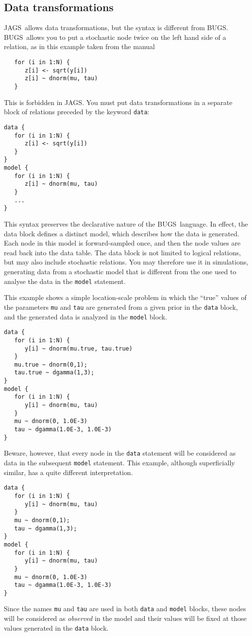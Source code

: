 \documentclass[11pt, a4paper, titlepage]{report}
\newcommand{\JAGS}{\textsf{JAGS}}
\newcommand{\BUGS}{\textsf{BUGS}}
\begin{document}



\subsection{Data transformations}
\label{section:data:tranformations}

\JAGS\ allows data transformations, but the syntax is different from
\BUGS.  \BUGS\ allows you to put a stochastic node twice on the left
hand side of a relation, as in this example taken from the manual
\begin{verbatim}
   for (i in 1:N) {
      z[i] <- sqrt(y[i])
      z[i] ~ dnorm(mu, tau)
   }
\end{verbatim}
This is forbidden in \JAGS. You must put data transformations in a 
separate block of relations preceded by the keyword \texttt{data}:
\begin{verbatim}
data {
   for (i in 1:N) {
      z[i] <- sqrt(y[i])
   }
}
model {
   for (i in 1:N) {
      z[i] ~ dnorm(mu, tau)
   }
   ...
}
\end{verbatim}
This syntax preserves the declarative nature of the \BUGS\ language.
In effect, the data block defines a distinct model, which describes
how the data is generated. Each node in this model is forward-sampled
once, and then the node values are read back into the data table. The
data block is not limited to logical relations, but may also include
stochastic relations. You may therefore use it in simulations,
generating data from a stochastic model that is different from the one
used to analyse the data in the \texttt{model} statement.

This example shows a simple location-scale problem in which the ``true''
values of the parameters \texttt{mu} and \texttt{tau} are generated
from a given prior in the \texttt{data} block, and the generated
data is analyzed in the \texttt{model} block.
\begin{verbatim}
data {
   for (i in 1:N) {
      y[i] ~ dnorm(mu.true, tau.true) 
   }
   mu.true ~ dnorm(0,1);
   tau.true ~ dgamma(1,3);
}
model {
   for (i in 1:N) {     
      y[i] ~ dnorm(mu, tau)
   }
   mu ~ dnorm(0, 1.0E-3)
   tau ~ dgamma(1.0E-3, 1.0E-3)
}
\end{verbatim}
Beware, however, that every node in the \texttt{data} statement will
be considered as data in the subsequent \texttt{model} statement. This
example, although superficially similar, has a quite different interpretation.
\begin{verbatim}
data {
   for (i in 1:N) {
      y[i] ~ dnorm(mu, tau) 
   }
   mu ~ dnorm(0,1);
   tau ~ dgamma(1,3);
}
model {
   for (i in 1:N) {
      y[i] ~ dnorm(mu, tau)
   }
   mu ~ dnorm(0, 1.0E-3)
   tau ~ dgamma(1.0E-3, 1.0E-3)
}
\end{verbatim}
Since the names \texttt{mu} and \texttt{tau} are used in both
\texttt{data} and \texttt{model} blocks, these nodes will be
considered as {\em observed} in the model and their values will be
fixed at those values generated in the \texttt{data} block.
\end{document}
